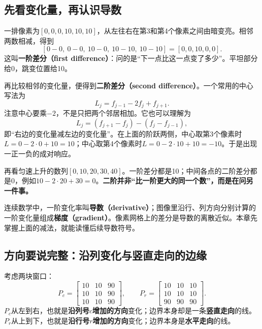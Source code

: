 \subsection{先看变化量，再认识导数}
一排像素为$[0,0,0,10,10,10]$，从左往右在第3和第4个像素之间由暗变亮。相邻两数相减，得到
\[
 [0-0,\ 0-0,\ 10-0,\ 10-10,\ 10-10]=[0,0,10,0,0].
\]
这叫\textbf{一阶差分（first difference）}：问的是“下一点比这一点变了多少”。平坦部分给0，跳变位置给10。

再比较相邻的变化量，便得到\textbf{二阶差分（second difference）}。一个常用的中心写法为
\[
 L_j=f_{j-1}-2f_j+f_{j+1}.
\]
注意中心要乘$-2$，不是只把两个邻居相加。它也可以理解为
\[
 L_j=(f_{j+1}-f_j)-(f_j-f_{j-1}),
\]
即“右边的变化量减左边的变化量”。在上面的阶跃两侧，中心取第3个像素时$L=0-2\cdot0+10=10$；中心取第4个像素时$L=0-2\cdot10+10=-10$。于是出现一正一负的成对响应。
\begin{center}
\end{center}
再看匀速上升的数列$[0,10,20,30,40]$。一阶差分都是10；中间各点的二阶差分都是0，例如$10-2\cdot20+30=0$。\textbf{二阶并非“比一阶更大的同一个数”，而是在问另一件事。}

连续数学中，一阶变化率叫\textbf{导数（derivative）}；图像里沿行、列方向分别计算的一阶变化量组成\textbf{梯度（gradient）}。像素网格上的差分是导数的离散近似。本章先掌握上面的减法，就能读懂后续导数符号。

\subsection{方向要说完整：沿列变化与竖直走向的边缘}
考虑两块窗口：
\[
 P_c=\begin{bmatrix}10&10&90\\10&10&90\\10&10&90\end{bmatrix},
 \qquad
 P_r=\begin{bmatrix}10&10&10\\10&10&10\\90&90&90\end{bmatrix}.
\]
$P_c$从左到右，也就是\textbf{沿列号$c$增加的方向}变化；边界本身却是一条\textbf{竖直走向}的线。$P_r$从上到下，也就是\textbf{沿行号$r$增加的方向}变化；边界本身是\textbf{水平走向}的线。

